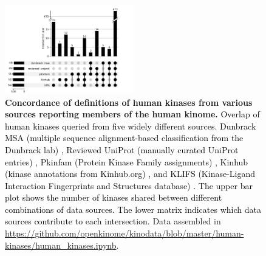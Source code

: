 \documentclass[9pt,lessons]{livecoms}
\newcommand{\revision}[1]{\textcolor{black}{#1}}
\begin{document}
\begin{figure}[tbp]
	\centering
	
	

		\centering
        \includegraphics[width=0.5\textwidth]{figures/human_kinase_upset.pdf}

	

    \caption{\textbf{Concordance of definitions of human kinases from various sources reporting members of the human kinome.} \revision{Overlap of human kinases queried from five widely different sources. Dunbrack MSA (multiple sequence alignment-based classification from the Dunbrack lab) \cite{modi2019structurally}, Reviewed UniProt (manually curated UniProt entries) \cite{uniprot2015uniprot}, Pkinfam (Protein Kinase Family assignments) \cite{manning2002protein}, Kinhub (kinase annotations from Kinhub.org) \cite{eid2017kinmap}, and KLIFS (Kinase-Ligand Interaction Fingerprints and Structures database) \cite{kooistra2016klifs}. The upper bar plot shows the number of kinases shared between different combinations of data sources. The lower matrix indicates which data sources contribute to each intersection.} Data assembled in \url{https://github.com/openkinome/kinodata/blob/master/human-kinases/human_kinases.ipynb}. %
    }
	\label{figure:kinome-definitions}    
\end{figure}
\end{document}
